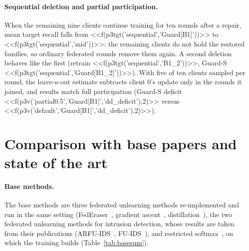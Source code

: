 \documentclass[pdflatex,sn-mathphys-num,iicol]{sn-jnl}
\begin{document}
\paragraph{Sequential deletion and partial participation.} When the remaining nine clients continue training for ten rounds after a repair, mean target recall falls from <<f(p3tgt('sequential','Guard[B1]'))>> to <<f(p3tgt('sequential','mid'))>>: the remaining clients do not hold the restored families, so ordinary federated rounds remove them again. A second deletion behaves like the first (retrain <<f(p3tgt('sequential','B1_2'))>>, Guard-S <<f(p3tgt('sequential','Guard[B1_2]'))>>). With five of ten clients sampled per round, the leave-$u$-out estimate subtracts client 0's update only in the rounds it joined, and results match full participation (Guard-S deficit <<f(p3v('partial0.5','Guard[B1]','dd_deficit'),2)>> versus <<f(p3v('default','Guard[B1]','dd_deficit'),2)>>).

\section{Comparison with base papers and state of the art}\label{sec:base}

\paragraph{Base methods.} The base methods are three federated unlearning methods re-implemented and run in the same setting (FedEraser~\cite{liu2021federaser}, gradient ascent~\cite{halimi2022}, distillation~\cite{wu2022distill}), the two federated unlearning methods for intrusion detection, whose results are taken from their publications (ARFU-IDS~\cite{yang2026arfu}, FU-IDS~\cite{wang2026fuids}), and restricted softmax~\cite{li2021fedrs}, on which the training builds (Table~\ref{tab:basesum}).
\end{document}
